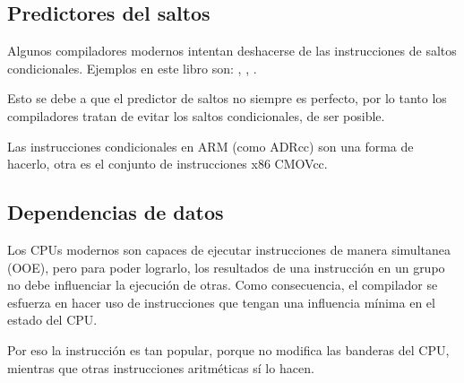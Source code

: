 ﻿

\subsection{Predictores del saltos}
\label{branch_predictors}

Algunos compiladores modernos intentan deshacerse de las instrucciones de saltos condicionales.
Ejemplos en este libro son: , , .

Esto se debe a que el predictor de saltos no siempre es perfecto, por lo tanto los compiladores
tratan de evitar los saltos condicionales, de ser posible.

Las instrucciones condicionales en ARM (como ADRcc) son una forma de hacerlo, otra es el conjunto de instrucciones x86 CMOVcc.

\subsection{Dependencias de datos}

Los CPUs modernos son capaces de ejecutar instrucciones de manera simultanea (\ac{OOE}), pero para
poder lograrlo, los resultados de una instrucci\'on en un grupo no debe influenciar la ejecuci\'on de otras.
Como consecuencia, el compilador se esfuerza en hacer uso de instrucciones que tengan una influencia m\'inima en el estado del CPU.

Por eso la instrucci\'on \LEA es tan popular, porque no modifica las banderas del CPU, mientras que otras instrucciones aritm\'eticas s\'i lo hacen.

